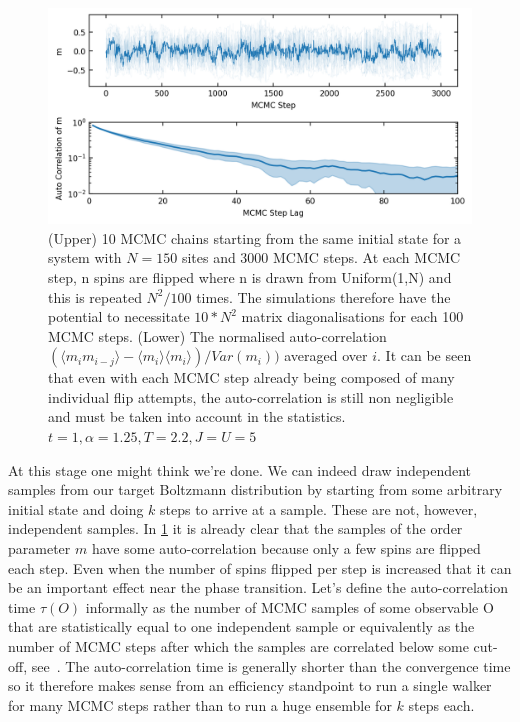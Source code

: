 \hypertarget{fig:m_autocorr}{%
\begin{figure}
\centering
\includegraphics[width=1\textwidth,height=\textheight]{figure_code/fk_chapter/lsr/figs/m_autocorr.png}
\caption[{Autocorrelation in MCMC}]{(Upper) 10 MCMC chains starting from the same initial state for a system with \(N = 150\) sites and 3000 MCMC steps. At each MCMC step, n spins are flipped where n is drawn from Uniform(1,N) and this is repeated \(N^2/100\) times. The simulations therefore have the potential to necessitate \(10*N^2\) matrix diagonalisations for each 100 MCMC steps. (Lower) The normalised auto-correlation \((\langle m_i m_{i-j}\rangle - \langle m_i\rangle \langle m_i \rangle) / Var(m_i))\) averaged over \(i\). It can be seen that even with each MCMC step already being composed of many individual flip attempts, the auto-correlation is still non negligible and must be taken into account in the statistics. \(t = 1, \alpha = 1.25, T = 2.2, J = U = 5\)}
\label{fig:m_autocorr}
\end{figure}
}

At this stage one might think we're done. We can indeed draw independent samples from our target Boltzmann distribution by starting from some arbitrary initial state and doing \(k\) steps to arrive at a sample. These are not, however, independent samples. In \cref{fig:m_autocorr} it is already clear that the samples of the order parameter \(m\) have some auto-correlation because only a few spins are flipped each step. Even when the number of spins flipped per step is increased that it can be an important effect near the phase transition. Let's define the auto-correlation time \(\tau(O)\) informally as the number of MCMC samples of some observable O that are statistically equal to one independent sample or equivalently as the number of MCMC steps after which the samples are correlated below some cut-off, see~\autocite{krauthIntroductionMonteCarlo1996}. The auto-correlation time is generally shorter than the convergence time so it therefore makes sense from an efficiency standpoint to run a single walker for many MCMC steps rather than to run a huge ensemble for \(k\) steps each.

